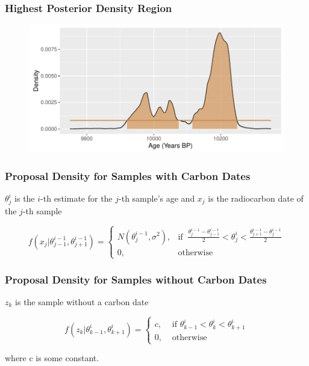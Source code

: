 \documentclass{beamer} %
\begin{document}
\begin{frame}
	\frametitle{Highest Posterior Density Region}
	\begin{figure}
	\includegraphics[width=\textwidth]{credintexam}
	\end{figure}

\end{frame}


\begin{frame}
	\frametitle{Proposal Density for Samples with Carbon Dates}
	$\theta_j^i$ is the $i$-th estimate for the $j$-th sample's age and $x_j$ is the radiocarbon date of the $j$-th sample
	
	\[
f(x_{j} | \theta^{i-1}_{j-1}, \theta^{i-1}_{j+1} ) =     
 \begin{cases}
      N(\theta^{i-1}_{j},\sigma^2), & \text{if }\ \frac{\theta^{i-1}_j  - \theta^{i-1}_{j-1}}{2}< \theta^i_j < \frac{\theta^{i-1}_{j+1} - \theta^{i-1}_j}{2}  \\
      0, & \text{otherwise}\ 
    \end{cases}
\]  
	
\end{frame}


\begin{frame}
	\frametitle{Proposal Density for Samples without Carbon Dates}
	
	$z_k$ is the sample without a carbon date
	
	\[
f(z_k | \theta_{k-1}^i, \theta_{k+1}^i) = 
\begin{cases}
	c, & \text{ if }\theta^i_{k-1} < \theta_k^i < \theta^i_{k+1}  \\
	0, & \text{ otherwise}
\end{cases}
\]

where c is some constant.

\end{frame}
\end{document}
